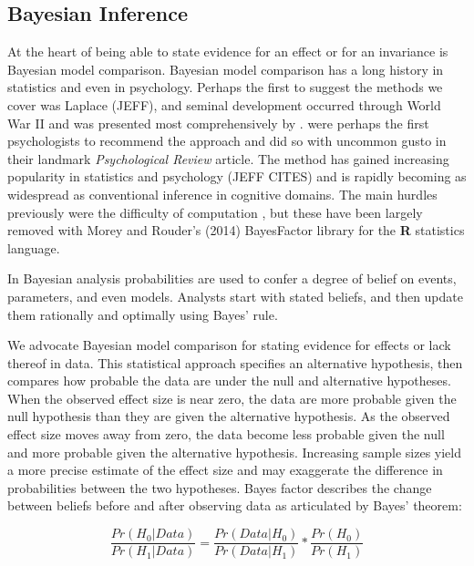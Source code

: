 \documentclass[fignum,nobf,man]{apa}
\begin{document}
\subsection{Bayesian Inference}
At the heart of being able to state evidence for an effect or for an invariance is Bayesian model comparison.  Bayesian model comparison has a long history in statistics and even in psychology.  Perhaps the first to suggest the methods we cover was Laplace (JEFF), and seminal development occurred through World War II and was presented most comprehensively by \citet{Jeffreys:1961}.  \citet{Edwards:etal:1963} were perhaps the first psychologists to recommend the approach and did so with uncommon gusto in their landmark {\em Psychological Review} article.  The method has gained increasing popularity in statistics and psychology (JEFF CITES) and is rapidly becoming as widespread as conventional inference in cognitive domains.  
The main hurdles previously were the difficulty of computation \citep{Gallistel:2009}, but these have been largely removed with Morey and Rouder's (2014) %
BayesFactor library for the {\bf R} statistics language.

In Bayesian analysis probabilities are used to confer a degree of belief on events, parameters, and even models.  Analysts start with stated beliefs, and then update them rationally and optimally using Bayes' rule.  
 
 
We advocate Bayesian model comparison for stating evidence for effects or lack thereof in data. %
This statistical approach specifies an alternative hypothesis, then compares how probable the data are under the null and alternative hypotheses. When the observed effect size is near zero, the data are more probable given the null hypothesis than they are given the alternative hypothesis. As the observed effect size moves away from zero, the data become less probable given the null and more probable given the alternative hypothesis.  Increasing sample sizes yield a more precise estimate of the effect size and may exaggerate the difference in probabilities between the two hypotheses. Bayes factor describes the change between beliefs before and after observing data as articulated by Bayes' theorem:

\begin{equation}
\frac{Pr(H_0 | Data)}{Pr(H_1 | Data)} = \frac{Pr(Data | H_0)}{Pr(Data | H_1)} * \frac{Pr(H_0)}{Pr (H_1)} 
\end{equation}
\end{document}
